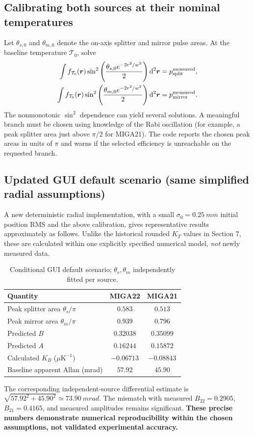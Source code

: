 \documentclass[11pt,a4paper]{article}
\numberwithin{equation}{section}
\newcommand{\Tat}{\mathcal{T}}
\newcommand{\dd}{\mathrm{d}}
\begin{document}
\subsection{Calibrating both sources at their nominal temperatures}

Let $\theta_{s,0}$ and $\theta_{m,0}$ denote the on-axis splitter and mirror
pulse areas. At the baseline temperature $\Tat_0$, solve
\begin{equation}\label{eq:calibrate}
\begin{aligned}
\int f_{\Tat_0}(\bm r)\sin^2\left(
\frac{\theta_{s,0}e^{-2r^2/w^2}}{2}\right)\dd^2\bm r
 &=p_{\rm split}^{\rm measured},\\
\int f_{\Tat_0}(\bm r)\sin^2\left(
\frac{\theta_{m,0}e^{-2r^2/w^2}}{2}\right)\dd^2\bm r
 &=p_{\rm mirror}^{\rm measured}.
\end{aligned}
\end{equation}
The nonmonotonic $\sin^2$ dependence can yield several solutions. A
meaningful branch must be chosen using knowledge of the Rabi oscillation
(for example, a peak splitter area just above $\pi/2$ for MIGA21).
The code reports the chosen peak areas in units of $\pi$ and warns if the
selected efficiency is unreachable on the requested branch.

\subsection{Updated GUI default scenario (same simplified radial assumptions)}

A new deterministic radial implementation, with a small
$\sigma_0=\SI{0.25}{mm}$ initial position RMS and the above calibration,
gives representative results approximately as follows. Unlike the historical
rounded $K_T$ values in Section 7, these are calculated within one explicitly
specified numerical model, \emph{not} newly measured data.
\begin{table}[ht]
\centering
\caption{Conditional GUI default scenario; $\theta_s,\theta_m$ independently fitted per source.}
\begin{tabular}{lcc}\toprule
Quantity & MIGA22 & MIGA21\\\midrule
Peak splitter area $\theta_s/\pi$ & $0.583$ & $0.513$\\
Peak mirror area $\theta_m/\pi$ & $0.939$ & $0.796$\\
Predicted $B$ & $0.32038$ & $0.35099$\\
Predicted $A$ & $0.16244$ & $0.15872$\\
Calculated $K_B$ ($\mu\mathrm K^{-1}$) & $-0.06713$ & $-0.08843$\\
Baseline apparent Allan (mrad) & $57.92$ & $45.90$\\\bottomrule
\end{tabular}
\end{table}
The corresponding independent-source differential estimate is
$\sqrt{57.92^2+45.90^2}\simeq\SI{73.90}{mrad}$. The mismatch with measured
$B_{22}=0.2905$, $B_{21}=0.4165$, and measured amplitudes remains significant.
\textbf{These precise numbers demonstrate numerical reproducibility within the
chosen assumptions, not validated experimental accuracy.}
\end{document}
